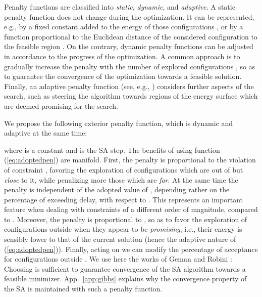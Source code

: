 \documentclass[draftcls,onecolumn]{IEEEtran}
\theoremstyle{plain}
\theoremstyle{definition}
\begin{document}
Penalty functions are classified into {\it static}, {\it dynamic}, and {\it adaptive}. A static penalty function does not change during the optimization. It can be represented, e.g., by a fixed constant added to the energy of those configurations , or by a function proportional to the Euclidean distance of the considered configuration to the feasible region \cite{Richardson90}. On the contrary, dynamic penalty functions can be adjusted in accordance to the progress of the optimization. A common approach is to gradually increase the penalty with the number of explored configurations \cite{Joines94}, so as to guarantee the convergence of the optimization towards a feasible solution. Finally, an adaptive penalty function (see, e.g., \cite{Coit96,Bean92}) considers further aspects of the search, such as steering the algorithm towards regions of the energy surface which are deemed promising for the search.    

We propose the following exterior penalty function, which is dynamic and adaptive at the same time: 

where  is a constant and  is the SA step.
The benefits of using function (\ref{eq:adoptedpen}) are manifold. First, the penalty is proportional to the violation of constraint , favoring the exploration of configurations which are out of  but {\it close} to it, while penalizing more those which are {\it far}. At the same time the penalty is independent of the adopted value of , depending rather on the percentage of exceeding delay, with respect to . This represents an important feature when dealing with constraints of a different order of magnitude, compared to . Moreover, the penalty is proportional to , so as to favor the exploration of configurations outside  when they appear to be {\it promising}, i.e., their energy is sensibly lower to that of the current solution (hence the adaptive nature of (\ref{eq:adoptedpen})). Finally, acting on  we can modify the percentage of acceptance for configurations outside . We use here the works of Geman and Robini \cite{geman-graffigne, robini-bresler-magnin}: Choosing  is sufficient to guarantee convergence of the SA algorithm towards a feasible minimizer. App.~\ref{app:gibbs} explains why the convergence property of the SA is maintained with such a penalty function. 
\end{document}
